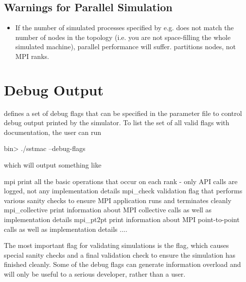 \subsection{Warnings for Parallel Simulation}
\label{subsec:parallelwarn}
\begin{itemize}
\item If the number of simulated processes specified by e.g.  does not match the number of nodes in the topology (i.e. you are not space-filling the whole simulated machine), parallel performance will suffer. \sstmacro partitions nodes, not MPI ranks.
\end{itemize}


\section{Debug Output}
\label{sec:dbgoutput}
\sstmacro defines a set of debug flags that can be specified in the parameter file to control debug output printed by the simulator.
To list the set of all valid flags with documentation, the user can run

\begin{ShellCmd}
bin> ./sstmac --debug-flags
\end{ShellCmd}

which will output something like

\begin{ViFile}
    mpi
        print all the basic operations that occur on each rank - only API calls are
        logged, not any implementation details
    mpi_check
        validation flag that performs various sanity checks to ensure MPI application
        runs and terminates cleanly
    mpi_collective
        print information about MPI collective calls as well as implementation details
    mpi_pt2pt
        print information about MPI point-to-point calls as well as implementation
        details
     ....
\end{ViFile}
The most important flag for validating simulations is the  flag,
which causes special sanity checks and a final validation check to ensure the simulation has finished cleanly.
Some of the debug flags can generate information overload and will only be useful to a serious developer, rather than a user.

